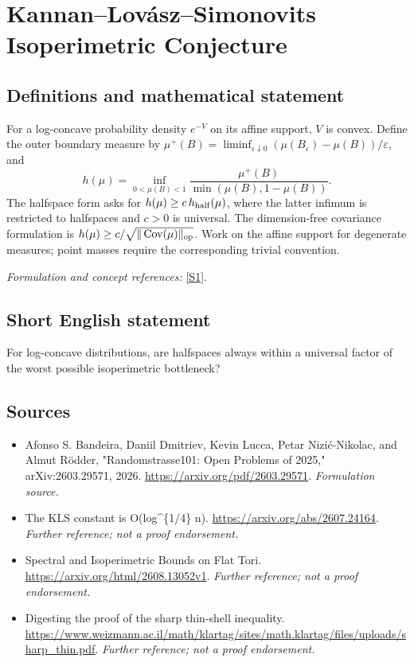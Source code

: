 \documentclass[11pt]{article}
\begin{document}
\section*{\texorpdfstring{Kannan–Lovász–Simonovits Isoperimetric Conjecture}{Kannan–Lovász–Simonovits Isoperimetric Conjecture}}\label{statement}
\subsection{Definitions and mathematical statement}
For a log-concave probability density $e^{-V}$ on its affine support, $V$ is convex. Define the outer boundary measure by $\mu^+(B)=\liminf_{\varepsilon\downarrow0}(\mu(B_\varepsilon)-\mu(B))/\varepsilon$, and
\[
 h(\mu)=\inf_{0<\mu(B)<1}\frac{\mu^+(B)}{\min(\mu(B),1-\mu(B))}.
\]
The halfspace form asks for $h(\mu)\ge c\,h_{\rm half}(\mu)$, where the latter infimum is restricted to halfspaces and $c>0$ is universal. The dimension-free covariance formulation is $h(\mu)\ge c/\sqrt{\|\operatorname{Cov}(\mu)\|_{\rm op}}$. Work on the affine support for degenerate measures; point masses require the corresponding trivial convention.
\par\smallskip\textit{Formulation and concept references:} \href{https://arxiv.org/pdf/2603.29571}{[S1]}.

\subsection{Short English statement}
For log-concave distributions, are halfspaces always within a universal factor of the worst possible isoperimetric bottleneck?
\subsection{Sources}
\begin{itemize}
\item[S1]Afonso S. Bandeira, Daniil Dmitriev, Kevin Lucca, Petar Nizić-Nikolac, and Almut Rödder, "Randomstrasse101: Open Problems of 2025," arXiv:2603.29571, 2026.
\url{https://arxiv.org/pdf/2603.29571}.
\textit{Formulation source.}
\item[S2]The KLS constant is O(log\textasciicircum{}\{1/4\} n).
\url{https://arxiv.org/abs/2607.24164}.
\textit{Further reference; not a proof endorsement.}
\item[S3]Spectral and Isoperimetric Bounds on Flat Tori.
\url{https://arxiv.org/html/2608.13052v1}.
\textit{Further reference; not a proof endorsement.}
\item[S4]Digesting the proof of the sharp thin-shell inequality.
\url{https://www.weizmann.ac.il/math/klartag/sites/math.klartag/files/uploads/sharp_thin.pdf}.
\textit{Further reference; not a proof endorsement.}
\end{itemize}
\end{document}
